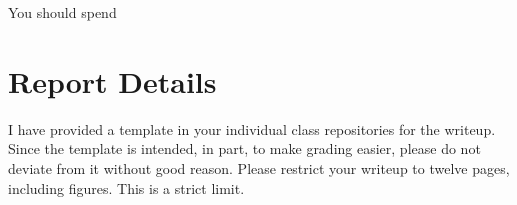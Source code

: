 \documentclass[11pt, oneside]{article}   	%
\begin{document}
You should spend

\section{Report Details}

I have provided a template in your individual class repositories for the
writeup. Since the template is intended, in part, to make grading easier,
please do not deviate from it without good reason.  Please restrict your
writeup to twelve pages, including figures. This is a strict limit.




\end{document}
